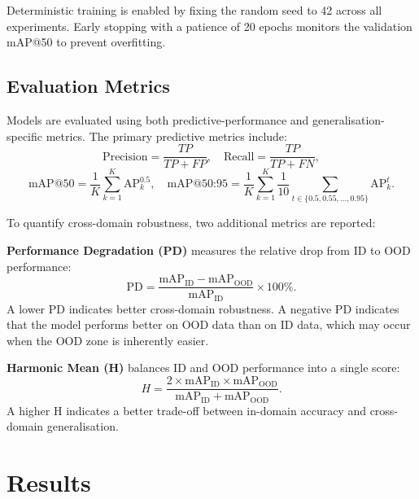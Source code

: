 \documentclass[12pt,a4paper]{article}
\begin{document}
Deterministic training is enabled by fixing the random seed to 42 across all experiments. Early stopping with a patience of 20 epochs monitors the validation mAP@50 to prevent overfitting.

\subsection{Evaluation Metrics}

Models are evaluated using both predictive-performance and generalisation-specific metrics. The primary predictive metrics include:
\begin{equation}
    \text{Precision} = \frac{TP}{TP + FP}, \quad \text{Recall} = \frac{TP}{TP + FN},
\end{equation}
\begin{equation}
    \text{mAP@50} = \frac{1}{K}\sum_{k=1}^{K} \text{AP}_k^{0.5}, \quad
    \text{mAP@50{:}95} = \frac{1}{K}\sum_{k=1}^{K} \frac{1}{10}\sum_{t \in \{0.5, 0.55, \ldots, 0.95\}} \text{AP}_k^{t}.
\end{equation}

To quantify cross-domain robustness, two additional metrics are reported:

\textbf{Performance Degradation (PD)} measures the relative drop from ID to OOD performance:
\begin{equation}
    \text{PD} = \frac{\text{mAP}_\text{ID} - \text{mAP}_\text{OOD}}{\text{mAP}_\text{ID}} \times 100\%.
\end{equation}
A lower PD indicates better cross-domain robustness. A negative PD indicates that the model performs better on OOD data than on ID data, which may occur when the OOD zone is inherently easier.

\textbf{Harmonic Mean (H)} balances ID and OOD performance into a single score:
\begin{equation}
    H = \frac{2 \times \text{mAP}_\text{ID} \times \text{mAP}_\text{OOD}}{\text{mAP}_\text{ID} + \text{mAP}_\text{OOD}}.
\end{equation}
A higher H indicates a better trade-off between in-domain accuracy and cross-domain generalisation.


\section{Results}
\end{document}
